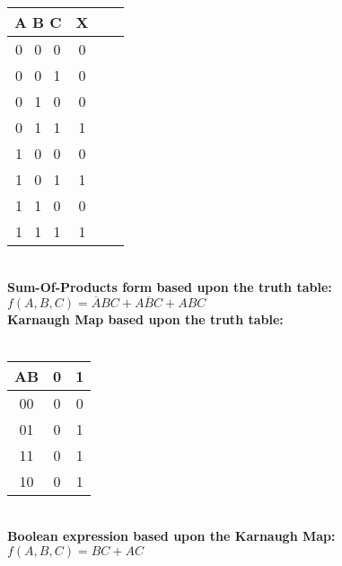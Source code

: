 \documentclass[12pt]{article}
\begin{document}
	\begin{center}
	
		\begin{tabular}{ |c|c|c|c| } 
			\hline
			\textbf{A}  \textbf{B}  \textbf{C} & \textbf{X}  \\
			\hline
			0      \     0     \      0          & 0    \\
			0      \     0     \      1          & 0    \\
			0      \     1     \      0          & 0    \\
			0      \     1     \      1          & 1    \\
			1      \     0     \      0          & 0    \\
			1      \     0     \      1          & 1    \\
			1      \     1     \      0          & 0    \\
			1      \     1     \      1          & 1    \\
			\hline
			
		\end{tabular} \vspace{0.6cm} \\
		
		\textbf{Sum-Of-Products form based upon the truth table: } \vspace{.2cm} \\
		$f(A, B, C) = \overline{A}BC + A\overline{B}C + ABC$  \vspace{0.5cm} \\
		
		\textbf{Karnaugh Map based upon the truth table: } \vspace{.2cm}  \\
		
		\ \ \ \ \ \ \  \\
		
		\begin{tabular}{ |c|c|c| } 
		
			\hline
			
			AB  & 0 & 1  \\
			\hline
			00 & 0 & 0  \\
			\hline
			01 & 0 & 1  \\
			\hline
			11 & 0 & 1  \\
			\hline
			10 & 0 & 1  \\
			\hline
			
			
		\end{tabular} \vspace{0.6cm} \\
		
		\textbf{Boolean expression based upon the Karnaugh Map: } \vspace{.2cm} \\
		$f(A, B, C) = BC + AC$  \vspace{0.5cm} \\
		
		
	\end{center}
	
\end{document}
